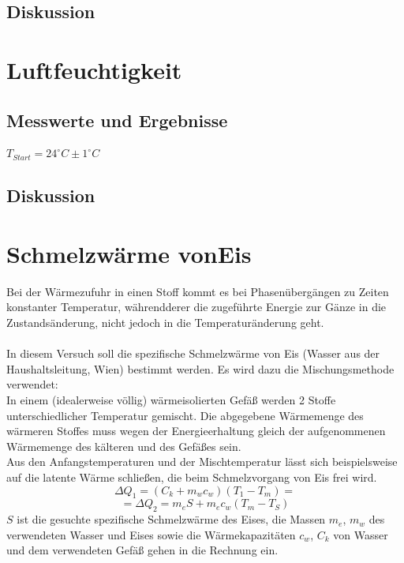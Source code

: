 \documentclass[12pt,a4paper]{article}
\begin{document}
\begin{multicols}{2}
\subsection{Diskussion}


\section{Luftfeuchtigkeit}
\subsection{Messwerte und Ergebnisse}
$T_{Start} = 24^{\circ}C \pm 1^{\circ}C$\\

\subsection{Diskussion}



\section{Schmelzwärme vonEis}
Bei der Wärmezufuhr in einen Stoff kommt es bei Phasenübergängen zu Zeiten konstanter Temperatur, währendderer die zugeführte Energie zur Gänze in die Zustandsänderung, nicht jedoch in die Temperaturänderung geht.\\
\\
In diesem Versuch soll die spezifische Schmelzwärme von Eis (Wasser aus der Haushaltsleitung, Wien) bestimmt werden. Es wird dazu die Mischungsmethode verwendet:\\
In einem (idealerweise völlig) wärmeisolierten Gefäß werden 2 Stoffe unterschiedlicher Temperatur gemischt. Die abgegebene Wärmemenge des wärmeren Stoffes muss wegen der Energieerhaltung gleich der aufgenommenen Wärmemenge des kälteren und des Gefäßes sein.\\
Aus den Anfangstemperaturen und der Mischtemperatur lässt sich beispielsweise auf die latente Wärme schließen, die beim Schmelzvorgang von Eis frei wird.
$$\Delta Q_1=(C_k+m_wc_w)(T_1-T_m)=$$
$$=\Delta Q_2 = m_eS+m_ec_w(T_m-T_S)$$
$S$ ist die gesuchte spezifische Schmelzwärme des Eises, die Massen $m_e$, $m_w$ des verwendeten Wasser und Eises sowie die Wärmekapazitäten $c_w$, $C_k$ von Wasser und dem verwendeten Gefäß gehen in die Rechnung ein.\\


\end{multicols}
\end{document}
